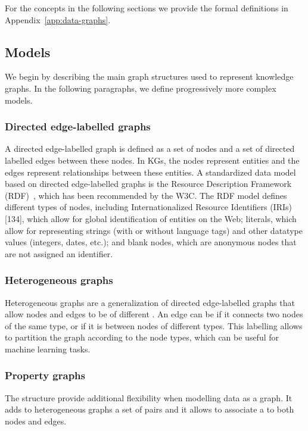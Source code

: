 For the concepts in the following sections we provide the formal definitions in Appendix~\ref{app:data-graphs}.

\subsection{Models}\label{models}
We begin by describing the main graph structures used to represent knowledge graphs. In the following paragraphs, we define progressively more complex models. 

\subsubsection{Directed edge-labelled graphs}
A directed edge-labelled graph is defined as a set of nodes and a set of directed labelled edges between these nodes. In KGs, the nodes represent entities and the edges represent relationships between these entities. A standardized data model based on directed edge-labelled graphs is the Resource Description Framework (RDF)~\cite{Cyganiak2014rdf}, which has been recommended by the W3C. The RDF model defines different types of nodes, including Internationalized Resource Identifiers (IRIs) [134], which allow for global identification of entities on the Web; literals, which allow for representing strings (with or without language tags) and other datatype values (integers, dates, etc.); and blank nodes, which are anonymous nodes that are not assigned an identifier.

\subsubsection{Heterogeneous graphs}
Heterogeneous graphs are a generalization of directed edge-labelled graphs that allow nodes and edges to be of different . An edge can be  if it connects two nodes of the same type, or  if it is between nodes of different types. This labelling allows to partition the graph according to the node types, which can be useful for machine learning tasks.

\subsubsection{Property graphs}
The structure provide additional flexibility when modelling data as a graph. It adds to heterogeneous graphs a set of  pairs and it allows to associate a  to both nodes and edges.

